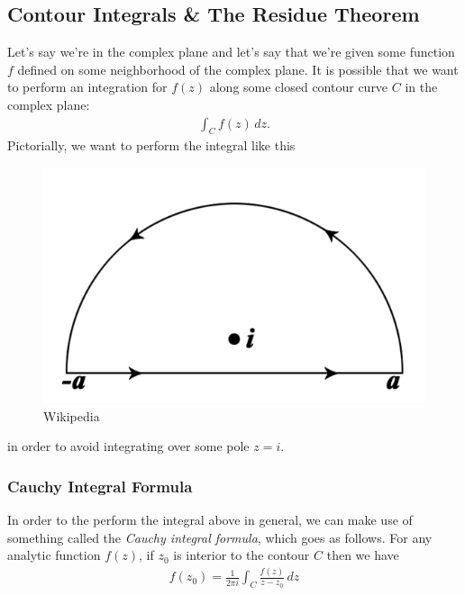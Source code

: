 \documentclass{book}
\theoremstyle{definition}
\newcommand{\f}[2]{\frac{#1}{#2}}
\begin{document}
\newpage

\subsection{Contour Integrals \& The Residue Theorem}

Let's say we're in the complex plane and let's say that we're given some function $f$ defined on some neighborhood of the complex plane. It is possible that we want to perform an integration for $f(z)$ along some closed contour curve $C$ in the complex plane:
\begin{align}
\int_C f(z)\,dz.
\end{align}
Pictorially, we want to perform the integral like this
\begin{figure}[!htb]
	\centering
	\includegraphics[scale=0.7]{contour}
	\caption{Wikipedia}
\end{figure}
in order to avoid integrating over some pole $z = i$.

\subsubsection{Cauchy Integral Formula}
In order to the perform the integral above in general, we can make use of something called the \textit{Cauchy integral formula}, which goes as follows. For any analytic function $f(z)$, if $z_0$ is interior to the contour $C$ then we have
\begin{align}
\boxed{f(z_0) = \f{1}{2\pi i}\int_C \f{f(z)}{z - z_0}\,dz}
\end{align}
\end{document}
